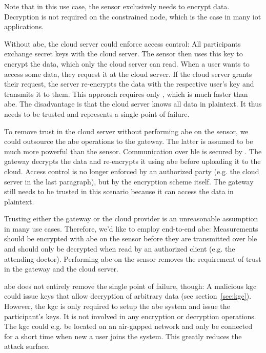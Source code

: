 Note that in this use case, the sensor exclusively needs to encrypt data.
Decryption is not required on the constrained node, which is the case in many \acrshort{iot} applications.

Without \acrshort{abe}, the cloud server could enforce access control:
All participants exchange secret keys with the cloud server.
The sensor then uses this key to encrypt the data, which only the cloud server can read.
When a user wants to access some data, they request it at the cloud server.
If the cloud server grants their request, the server re-encrypts the data with the respective user's key and transmits it to them.
This approach requires only , which is much faster than \acrshort{abe}.
The disadvantage is that the cloud server knows all data in plaintext. It thus needs to be trusted and represents a single point of failure.

To remove trust in the cloud server without performing \acrshort{abe} on the sensor, we could outsource the \acrshort*{abe} operations to the gateway.
The latter is assumed to be much more powerful than the sensor.
Communication over \acrshort{ble} is secured by .
The gateway decrypts the data and re-encrypts it using \acrshort{abe} before uploading it to the cloud.
Access control is no longer enforced by an authorized party (e.g. the cloud server in the last paragraph), but by the encryption scheme itself.
The gateway still needs to be trusted in this scenario because it can access the data in plaintext.

Trusting either the gateway or the cloud provider is an unreasonable assumption in many use cases.
Therefore, we'd like to employ end-to-end \acrlong{abe}:
Measurements should be encrypted with \acrshort{abe} on the sensor before they are transmitted over \acrshort{ble} and should only be decrypted when read by an authorized client (e.g. the attending doctor).
Performing \acrshort{abe} on the sensor removes the requirement of trust in the gateway and the cloud server.

\Acrshort{abe} does not entirely remove the single point of failure, though:
A malicious \acrfull{kgc} could issue keys that allow decryption of arbitrary data (see section~\ref{sec:kgc}).
However, the \acrshort{kgc} is only required to setup the \acrshort{abe} system and issue the participant's keys.
It is not involved in any encryption or decryption operations.
The \acrshort{kgc} could e.g. be located on an air-gapped network and only be connected for a short time when new a user joins the system. 
This greatly reduces the attack surface.

